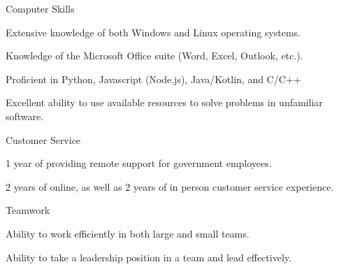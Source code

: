 
\begin{cvskills}

  \cvskill
    {Computer Skills} %
    {
	\begin{cvitems}
	\item {Extensive knowledge of both Windows and Linux operating systems.}
	\item {Knowledge of the Microsoft Office suite (Word, Excel, Outlook, etc.).}
	\item {Proficient in Python, Javascript (Node.js), Java/Kotlin, and C/C++}
	\item {Excellent ability to use available resources to solve problems in unfamiliar software.}
	\end{cvitems}
    } %

  \cvskill
    {Customer Service} %
    {
	\begin{cvitems}
	\item {1 year of providing remote support for government employees.}
	\item {2 years of online, as well as 2 years of in person customer service experience.}
	\end{cvitems}
    } %

  \cvskill
    {Teamwork} %
    {
	\begin{cvitems}
	\item {Ability to work efficiently in both large and small teams.}
	\item {Ability to take a leadership position in a team and lead effectively.}
	\end{cvitems}
    } %

\end{cvskills}
